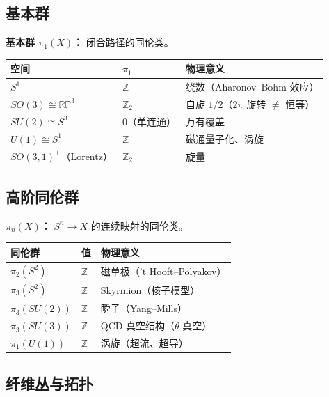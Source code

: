 \subsection{基本群}

\textbf{基本群 $\pi_1(X)$：} 闭合路径的同伦类。

\begin{center}
\begin{tabular}{L{3cm}L{3cm}L{5cm}}
\toprule
\textbf{空间} & \textbf{$\pi_1$} & \textbf{物理意义} \\
\midrule
$S^1$ & $\mathbb{Z}$ & 绕数（Aharonov--Bohm 效应） \\
$SO(3) \cong \mathbb{RP}^3$ & $\mathbb{Z}_2$ & 自旋 $1/2$（$2\pi$ 旋转 $\neq$ 恒等） \\
$SU(2) \cong S^3$ & $0$（单连通） & 万有覆盖 \\
$U(1) \cong S^1$ & $\mathbb{Z}$ & 磁通量子化、涡旋 \\
$SO(3,1)^+$（Lorentz） & $\mathbb{Z}_2$ & 旋量 \\
\bottomrule
\end{tabular}
\end{center}

\subsection{高阶同伦群}

\textbf{$\pi_n(X)$：} $S^n \to X$ 的连续映射的同伦类。

\begin{center}
\begin{tabular}{L{3cm}L{3cm}L{5cm}}
\toprule
\textbf{同伦群} & \textbf{值} & \textbf{物理意义} \\
\midrule
$\pi_2(S^2)$ & $\mathbb{Z}$ & 磁单极（'t Hooft--Polyakov） \\
$\pi_3(S^2)$ & $\mathbb{Z}$ & Skyrmion（核子模型） \\
$\pi_3(SU(2))$ & $\mathbb{Z}$ & 瞬子（Yang--Mills） \\
$\pi_3(SU(3))$ & $\mathbb{Z}$ & QCD 真空结构（$\theta$ 真空） \\
$\pi_1(U(1))$ & $\mathbb{Z}$ & 涡旋（超流、超导） \\
\bottomrule
\end{tabular}
\end{center}

\subsection{纤维丛与拓扑}

